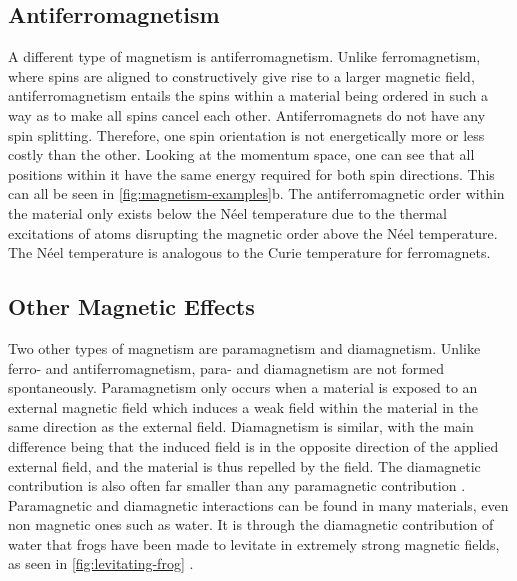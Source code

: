     \subsection{Antiferromagnetism}
    A different type of magnetism is antiferromagnetism. Unlike ferromagnetism, where spins are aligned to constructively give rise to a larger magnetic 
    field, antiferromagnetism entails the spins within a material being ordered in such a way as to make all spins cancel each other. Antiferromagnets 
    do not have any spin splitting. Therefore, one spin orientation is not energetically more or less costly than the other. Looking at the momentum 
    space, one can see that all positions within it have the same energy required for both spin directions. This can all be seen in 
    \autoref{fig:magnetism-examples}b. The antiferromagnetic order within the material only exists below the Néel temperature due to the thermal 
    excitations of atoms disrupting the magnetic order above the Néel temperature. The Néel temperature is analogous to the Curie temperature for 
    ferromagnets. \cite{mugiraneza2022tutorial}
    \subsection{Other Magnetic Effects}
    Two other types of magnetism are paramagnetism and diamagnetism. Unlike ferro- and antiferromagnetism, para- and diamagnetism are not formed 
    spontaneously. Paramagnetism only occurs when a material is exposed to an external magnetic field which induces a weak field within the material 
    in the same direction as the external field. Diamagnetism is similar, with the main difference being that the induced field is in the opposite 
    direction of the applied external field, and the material is thus repelled by the field. The diamagnetic contribution is also often far smaller 
    than any paramagnetic contribution \cite{mugiraneza2022tutorial}. Paramagnetic and diamagnetic interactions can be found in many materials, even non 
    magnetic ones such as water. It is through the diamagnetic contribution of water that frogs have been made to levitate in extremely strong magnetic 
    fields, as seen in \autoref{fig:levitating-frog} \cite{berry1997flying}.
    
